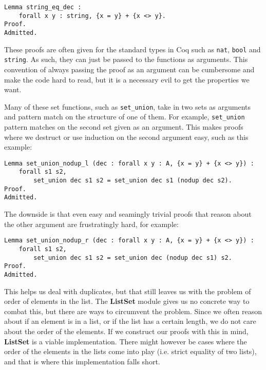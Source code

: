 \begin{lstlisting}[language=Coq, label=lst:string_eq_dec]
Lemma string_eq_dec :
    forall x y : string, {x = y} + {x <> y}.
Proof.
Admitted.
\end{lstlisting}

These proofs are often given for the standard types in Coq such as \lstinline[language=Coq]{nat},
\lstinline[language=Coq]{bool} and \lstinline[language=Coq]{string}.
As such, they can just be passed to the functions as arguments.
This convention of always passing the proof as an argument can be cumbersome and make the code hard to read,
but it is a necessary evil to get the properties we want.

Many of these set functions, such as \lstinline[language=Coq]{set_union},
take in two sets as arguments and pattern match on the structure of one of them.
For example, \lstinline[language=Coq]{set_union} pattern matches on the second set given as an argument.
This makes proofs where we destruct or use induction on the second argument easy, such as this example:
\begin{lstlisting}[language=Coq, label=lst:set_union_nodup_l]
Lemma set_union_nodup_l (dec : forall x y : A, {x = y} + {x <> y}) :
    forall s1 s2,
        set_union dec s1 s2 = set_union dec s1 (nodup dec s2).
Proof.
Admitted.
\end{lstlisting}

The downside is that even easy and seamingly trivial proofs that reason about the other argument are frustratingly hard,
for example:

\begin{lstlisting}[language=Coq, label=lst:set_union_nodup_r]
Lemma set_union_nodup_r (dec : forall x y : A, {x = y} + {x <> y}) :
    forall s1 s2,
        set_union dec s1 s2 = set_union dec (nodup dec s1) s2.
Proof.
Admitted.
\end{lstlisting}

This helps us deal with duplicates, but that still leaves us with the problem of order of elements in the list.
The \textbf{ListSet} module gives us no concrete way to combat this, but there are ways to circumvent the problem.
Since we often reason about if an element is in a list, or if the list has a certain length,
we do not care about the order of the elements.
If we construct our proofs with this in mind, \textbf{ListSet} is a viable implementation.
There might however be cases where the order of the elements in the lists come into play (i.e. strict equality of two lists),
and that is where this implementation falls short.

